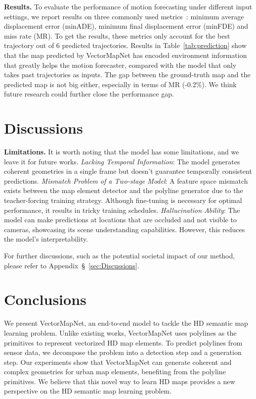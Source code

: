 \documentclass{article}
\theoremstyle{plain}
\theoremstyle{definition}
\theoremstyle{remark}
\begin{document}
\noindent\textbf{Results.} To evaluate the performance of motion forecasting under different input settings, we report results on three commonly used metrics~\citep{chang2019argoverse}: minimum average displacement error (minADE), minimum final displacement error (minFDE) and miss rate (MR). To get the results, these metrics only account for the best trajectory out of 6 predicted trajectories. Results in Table~\ref{tab:prediction} show that the map predicted by VectorMapNet has encoded environment information that greatly helps the motion forecaster, compared with the model that only takes past trajectories as inputs. The gap between the ground-truth map and the predicted map is not big either, especially in terms of MR (-0.2\%). We think future research could further close the performance gap.

\section{Discussions}
\noindent\textbf{Limitations.} It is worth noting that the model has some limitations, and we leave it for future works. \textit{Lacking Temporal Information}: The model generates coherent geometries in a single frame but doesn't guarantee temporally consistent predictions. \textit{Mismatch Problem of a Two-stage Model}: A feature space mismatch exists between the map element detector and the polyline generator due to the teacher-forcing training strategy. Although fine-tuning is necessary for optimal performance, it results in tricky training schedules. \textit{Hallucination Ability}: The model can make predictions at locations that are occluded and not visible to cameras, showcasing its scene understanding capabilities. However, this reduces the model's interpretability.

For further discussions, such as the potential societal impact of our method, please refer to Appendix~\S~\ref{sec:Discussions}.

\section{Conclusions}
We present VectorMapNet, an end-to-end model to tackle the HD semantic map learning problem. Unlike existing works, VectorMapNet uses polylines as the primitives to represent vectorized HD map elements. To predict polylines from sensor data, we decompose the problem into a detection step and a generation step. Our experiments show that VectorMapNet can generate coherent and complex geometries for urban map elements, benefiting from the polyline primitives. We believe that this novel way to learn HD maps provides a new perspective on the HD semantic map learning problem.
\end{document}
